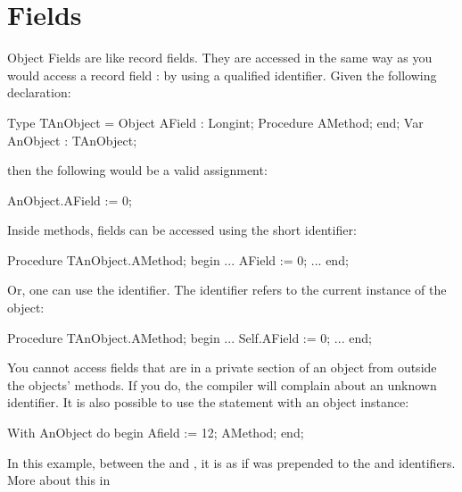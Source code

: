 \documentclass{report}
\begin{document}
\section{Fields}
Object Fields are like record fields. They are accessed in the same way as
you would access a record field : by using a qualified identifier. Given the
following declaration:
\begin{listing}
Type TAnObject = Object
       AField : Longint;
       Procedure AMethod;
       end;
Var AnObject : TAnObject;
\end{listing}
then the following would be a valid assignment:
\begin{listing}
  AnObject.AField := 0;
\end{listing}
Inside methods, fields can be accessed using the short identifier:
\begin{listing}
Procedure TAnObject.AMethod;
begin
  ...
  AField := 0;
  ...
end;
\end{listing}
Or, one can use the  identifier. The  identifier refers
to the current instance of the object:
\begin{listing}
Procedure TAnObject.AMethod;
begin
  ...
  Self.AField := 0;
  ...
end;
\end{listing}
You cannot access fields that are in a private section of an object from
outside the objects' methods. If you do, the compiler will complain about
an unknown identifier.
It is also possible to use the  statement with an object instance:
\begin{listing}
With AnObject do
  begin
  Afield := 12;
  AMethod;
  end;
\end{listing}
In this example, between the  and , it is as if
 was prepended to the  and 
identifiers. More about this in 
\end{document}

